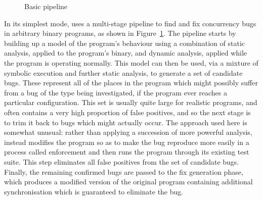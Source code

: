 \begin{figure}
\begin{center}
  \caption{Basic pipeline}
\end{center}
\label{fig:basic_pipeline}
\end{figure}

In its simplest mode, \technique{} uses a multi-stage pipeline to find
and fix concurrency bugs in arbitrary binary programs, as shown in
Figure~\ref{fig:basic_pipeline}.  The pipeline starts by building up a
model of the program's behaviour using a combination of static
analysis, applied to the program's binary, and dynamic analysis,
applied while the program is operating normally.  This model can then
be used, via a mixture of symbolic execution and further static
analysis, to generate a set of candidate bugs.  These represent all of
the places in the program which might possibly suffer from a bug of
the type being investigated, if the program ever reaches a particular
configuration.  This set is usually quite large for realistic
programs, and often contains a very high proportion of false
positives, and so the next stage is to trim it back to bugs which
might actually occur.  The approach used here is somewhat unusual:
rather than applying a succession of more powerful analysis,
{\technique} instead modifies the program so as to make the bug
reproduce more easily in a process called enforcement and then runs the program through its existing test
suite.  This step eliminates all false positives from the set of
candidate bugs.  Finally, the remaining confirmed bugs are passed to
the fix generation phase, which produces a modified version of the
original program containing additional synchronisation which is
guaranteed to eliminate the bug.


